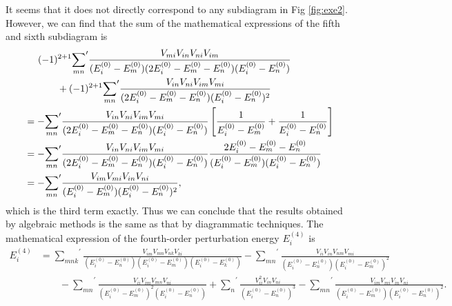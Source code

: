 \documentclass[a4paper]{book}
\newcounter{solution}[chapter]
\newcommand\Figref[1]{Fig \ref{#1}}
\begin{document}
\begin{solution}
	It seems that it does not directly correspond to any subdiagram in \Figref{fig:exe2}. However, we can find that the sum of the mathematical expressions of the fifth and sixth subdiagram is
	\begin{align*}
		&\hspace{1.4em}(-1)^{2+1} { \sum_{mn} }^\prime \frac{ V_{mi} V_{in} V_{ni} V_{im} }{ ( E^{(0)}_i - E^{(0)}_m ) ( 2E^{(0)}_i - E^{(0)}_m - E^{(0)}_n ) ( E^{(0)}_i - E^{(0)}_n ) }  \\
		&\hspace{3.4em}+ (-1)^{2+1} { \sum_{mn} }^\prime \frac{ V_{in} V_{ni} V_{im} V_{mi} }{ ( 2E^{(0)}_i - E^{(0)}_m - E^{(0)}_n ) ( E^{(0)}_i - E^{(0)}_n )^2 } \\
		&= - { \sum_{mn} }^\prime \frac{ V_{in} V_{ni} V_{im} V_{mi} }{ ( 2E^{(0)}_i - E^{(0)}_m - E^{(0)}_n ) ( E^{(0)}_i - E^{(0)}_n ) } \left[ \frac{ 1 }{ E^{(0)}_i - E^{(0)}_m } + \frac{ 1 }{ E^{(0)}_i - E^{(0)}_n } \right] \\
		&= - { \sum_{mn} }^\prime \frac{ V_{in} V_{ni} V_{im} V_{mi} }{ ( 2E^{(0)}_i - E^{(0)}_m - E^{(0)}_n ) ( E^{(0)}_i - E^{(0)}_n ) } \frac{ 2E^{(0)}_i - E^{(0)}_m - E^{(0)}_n }{ ( E^{(0)}_i - E^{(0)}_m )( E^{(0)}_i - E^{(0)}_n ) } \\
		&= - { \sum_{mn} }^\prime \frac{ V_{im} V_{mi} V_{in} V_{ni} }{ ( E^{(0)}_i - E^{(0)}_m )( E^{(0)}_i - E^{(0)}_n )^2 } ,
	\end{align*}
	which is the third term exactly. Thus we can conclude that the results obtained by algebraic methods is the same as that by diagrammatic techniques. The mathematical expression of the fourth-order perturbation energy $E^{(4)}_i$ is
	\begin{align*}
		E^{(4)}_i &= { \sum_{mnk} }^\prime \frac{ V_{im} V_{mn} V_{nk} V_{ki} }{ (E^{(0)}_i - E^{(0)}_n) (E^{(0)}_i - E^{(0)}_m) (E^{(0)}_i - E^{(0)}_k) } - { \sum_{mn} }^\prime \frac{ V_{ii} V_{in} V_{nm} V_{mi} }{ (E^{(0)}_i - E^{(0)}_n) (E^{(0)}_i - E^{(0)}_m)^2 } \\
		&\hspace{2em} - { \sum_{mn} }^\prime \frac{ V_{ii} V_{im} V_{mn} V_{ni} }{ ( E^{(0)}_i - E^{(0)}_m )^2 ( E^{(0)}_i - E^{(0)}_n ) } + { \sum_n }^\prime \frac{ V^2_{ii} V_{in} V_{ni} }{ ( E^{(0)}_i - E^{(0)}_n )^3 } - { \sum_{mn} }^\prime \frac{ V_{im} V_{mi} V_{in} V_{ni} }{ ( E^{(0)}_i - E^{(0)}_m )( E^{(0)}_i - E^{(0)}_n )^2 } .
	\end{align*}
	
	\end{solution}
	
\end{document}
